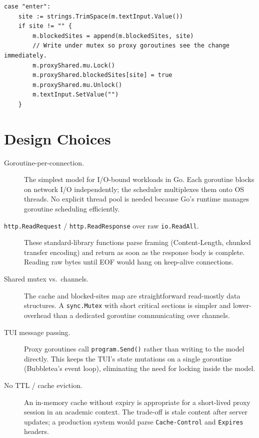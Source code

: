 \documentclass[11pt,a4paper]{article}
\begin{document}
\begin{lstlisting}[caption={Adding a blocked site at runtime (main.go).}]
case "enter":
    site := strings.TrimSpace(m.textInput.Value())
    if site != "" {
        m.blockedSites = append(m.blockedSites, site)
        // Write under mutex so proxy goroutines see the change immediately.
        m.proxyShared.mu.Lock()
        m.proxyShared.blockedSites[site] = true
        m.proxyShared.mu.Unlock()
        m.textInput.SetValue("")
    }
\end{lstlisting}

\section{Design Choices}

\begin{description}

  \item[Goroutine-per-connection.]
    The simplest model for I/O-bound workloads in Go. Each goroutine blocks on
    network I/O independently; the scheduler multiplexes them onto OS threads.
    No explicit thread pool is needed because Go's runtime manages goroutine
    scheduling efficiently.

  \item[\texttt{http.ReadRequest} / \texttt{http.ReadResponse} over raw
    \texttt{io.ReadAll}.]
    These standard-library functions parse framing (Content-Length, chunked
    transfer encoding) and return as soon as the response body is complete.
    Reading raw bytes until EOF would hang on keep-alive connections.

  \item[Shared mutex vs.\ channels.]
    The cache and blocked-sites map are straightforward read-mostly data
    structures. A \texttt{sync.Mutex} with short critical sections is simpler
    and lower-overhead than a dedicated goroutine communicating over channels.

  \item[TUI message passing.]
    Proxy goroutines call \texttt{program.Send()} rather than writing to the
    model directly. This keeps the TUI's state mutations on a single goroutine
    (Bubbletea's event loop), eliminating the need for locking inside the model.

  \item[No TTL / cache eviction.]
    An in-memory cache without expiry is appropriate for a short-lived proxy
    session in an academic context. The trade-off is stale content after server
    updates; a production system would parse \texttt{Cache-Control} and
    \texttt{Expires} headers.

\end{description}
\end{document}
